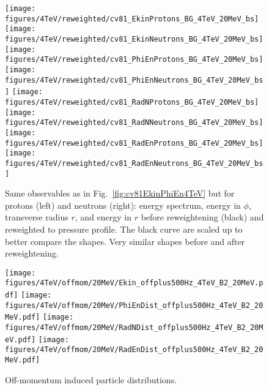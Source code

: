 \begin{figure}
\begin{center}
  \texttt{[image: figures/4TeV/reweighted/cv81\_EkinProtons\_BG\_4TeV\_20MeV\_bs]}
  \texttt{[image: figures/4TeV/reweighted/cv81\_EkinNeutrons\_BG\_4TeV\_20MeV\_bs]}
  \texttt{[image: figures/4TeV/reweighted/cv81\_PhiEnProtons\_BG\_4TeV\_20MeV\_bs]}
  \texttt{[image: figures/4TeV/reweighted/cv81\_PhiEnNeutrons\_BG\_4TeV\_20MeV\_bs]}
  \texttt{[image: figures/4TeV/reweighted/cv81\_RadNProtons\_BG\_4TeV\_20MeV\_bs]}
  \texttt{[image: figures/4TeV/reweighted/cv81\_RadNNeutrons\_BG\_4TeV\_20MeV\_bs]}
  \texttt{[image: figures/4TeV/reweighted/cv81\_RadEnProtons\_BG\_4TeV\_20MeV\_bs]}
  \texttt{[image: figures/4TeV/reweighted/cv81\_RadEnNeutrons\_BG\_4TeV\_20MeV\_bs]}
\end{center}
\vspace{-0.6cm}
 \caption{Same observables as in Fig.~\ref{fig:cv81EkinPhiEn4TeV} but for protons (left) and neutrons (right): energy spectrum, energy in $\phi$, transverse radius $r$, and energy in $r$ before reweightening (black) and reweighted to pressure profile. The black curve are scaled up to better compare the shapes. Very similar shapes before and after reweightening.
   \label{fig:cv81ProtNeut4TeV}}
\end{figure}



\begin{figure}
  \begin{center}
    \texttt{[image: figures/4TeV/offmom/20MeV/Ekin\_offplus500Hz\_4TeV\_B2\_20MeV.pdf]}
    \texttt{[image: figures/4TeV/offmom/20MeV/PhiEnDist\_offplus500Hz\_4TeV\_B2\_20MeV.pdf]}
  \texttt{[image: figures/4TeV/offmom/20MeV/RadNDist\_offplus500Hz\_4TeV\_B2\_20MeV.pdf]}
  \texttt{[image: figures/4TeV/offmom/20MeV/RadEnDist\_offplus500Hz\_4TeV\_B2\_20MeV.pdf]}

\end{center}
\vspace{-0.6cm}
 \caption{Off-momentum induced particle distributions.
  \label{offmom4TeV2}}
\end{figure}




